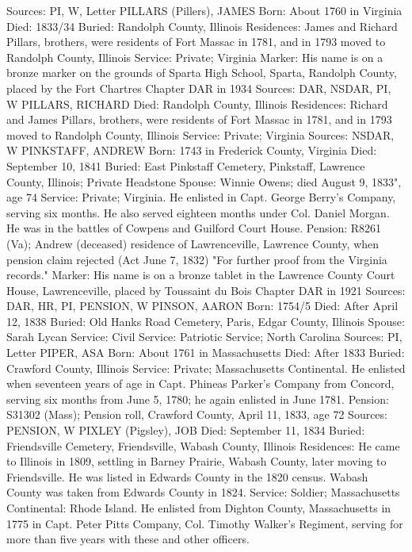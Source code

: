 Sources: PI, W, Letter 
PILLARS (Pillers), JAMES
Born: About 1760 in Virginia
Died: 1833/34
Buried: Randolph County, Illinois
Residences: James and Richard Pillars, brothers, were residents of Fort Massac in 1781, and in 1793 moved to Randolph County, Illinois
Service: Private; Virginia
Marker: His name is on a bronze marker on the grounds of Sparta High School, Sparta, Randolph County, placed by the Fort Chartres Chapter DAR in 1934
Sources: DAR, NSDAR, PI, W 
PILLARS, RICHARD 
Died: Randolph County, Illinois
Residences: Richard and James Pillars, brothers, were residents of Fort Massac in 1781, and in 1793 moved to Randolph County, Illinois
Service: Private; Virginia 
Sources: NSDAR, W 
PINKSTAFF, ANDREW
Born: 1743 in Frederick County, Virginia
Died: September 10, 1841
Buried: East Pinkstaff Cemetery, Pinkstaff, Lawrence County, Illinois; Private 
Headstone 
Spouse: Winnie Owens; died August 9, 1833", age 74
Service: Private; Virginia. He enlisted in Capt. George Berry's Company, serving six months. He also served eighteen months under Col. Daniel Morgan. He was in the battles of Cowpens and Guilford Court House. 
Pension: R8261 (Va); Andrew (deceased) residence of Lawrenceville, Lawrence County, when pension claim rejected (Act June 7, 1832) "For further proof from the Virginia records." 
Marker: His name is on a bronze tablet in the Lawrence County Court House, Lawrenceville, placed by Toussaint du Bois Chapter DAR in 1921
Sources: DAR, HR, PI, PENSION, W 
PINSON, AARON 
Born: 1754/5
Died: After April 12, 1838
Buried: Old Hanks Road Cemetery, Paris, Edgar County, Illinois 
Spouse: Sarah Lycan
Service: Civil
Service: Patriotic Service; North Carolina 
Sources: PI, Letter 
PIPER, ASA
Born: About 1761 in Massachusetts
Died: After 1833
Buried: Crawford County, Illinois
Service: Private; Massachusetts Continental. He enlisted when seventeen years of age in Capt. Phineas Parker's Company from Concord, serving six months from June 5, 1780; he again enlisted in June 1781. Pension: S31302 (Mass); Pension roll, Crawford County, April 11, 1833, age 72 
Sources: PENSION, W 
PIXLEY (Pigsley), JOB
Died: September 11, 1834
Buried: Friendsville Cemetery, Friendsville, Wabash County, Illinois 
Residences: He came to Illinois in 1809, settling in Barney Prairie, Wabash County, later moving to Friendsville. He was listed in Edwards County in the 1820 census. Wabash County was taken from Edwards County in 1824. 
Service: Soldier; Massachusetts Continental: Rhode Island. He enlisted from Dighton County, Massachusetts in 1775 in Capt. Peter Pitts Company, Col. Timothy Walker's Regiment, serving for more than five years with these and other officers. 
